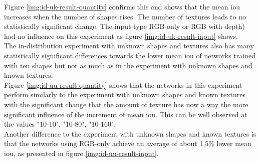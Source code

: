 			Figure \ref{img:id-uk-result-quantity} confirms this and shows that the mean \ac{iou} increases when the number of shapes rises. The number of textures leads to no statistically significant change.
			The input type RGB-only or RGB with depth) had no influence on this experiment as figure \ref{img:id-uk-result-input} shows.\\
			The in-distribution experiment with unknown shapes and textures also has many statistically significant differences towards the lower mean \ac{iou} of networks trained with ten shapes but not as much as in the experiment with unknown shapes and known textures.\\ %
			Figure \ref{img:id-uu-result-quantity} shows that the networks in this experiment perform similarly to the experiment with unknown shapes and known textures with the significant change that the amount of texture has now a way the more significant influence of the increment of mean \ac{iou}. This can be well observed at the values "10-10", "10-80", "10-160".\\
			Another difference to the experiment with unknown shapes and known textures is that the networks using RGB-only achieve an average of about 1,5\% lower mean \ac{iou}, as presented in figure \ref{img:id-uu-result-input}.
			
